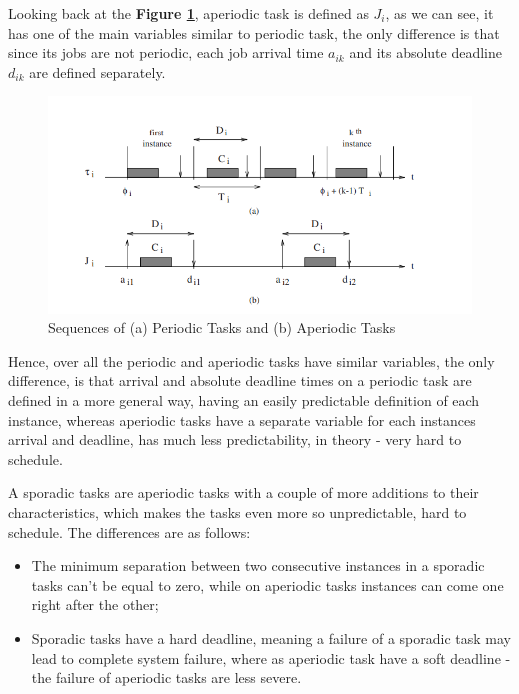 \documentclass[conference]{IEEEtran}
\begin{document}
Looking back at the \textbf{Figure \ref{tasks}}, aperiodic task is defined as $J_i$, as we can see, it has one of the main variables similar to periodic task, the only difference is that since its jobs are not periodic, each job arrival time $a_{ik}$ and its absolute deadline $d_{ik}$ are defined separately.

\begin{figure}[htbp]
\centerline{\includegraphics[scale=.48]{Tasks.png}}
\caption{Sequences of (a) Periodic Tasks and (b) Aperiodic Tasks \cite{b1}}
\label{tasks}
\end{figure}

Hence, over all the periodic and aperiodic tasks have similar variables, the only difference, is that arrival and absolute deadline times on a periodic task are defined in a more general way, having an easily predictable definition of each instance, whereas aperiodic tasks have a separate variable for each instances arrival and deadline, has much less predictability, in theory - very hard to schedule.

A sporadic tasks are aperiodic tasks with a couple of more additions to their characteristics, which makes the tasks even more so unpredictable, hard to schedule. The differences are as follows:

\begin{itemize}
    \item The minimum separation between two consecutive instances in a sporadic tasks can't be equal to zero, while on aperiodic tasks instances can come one right after the other;
    \item Sporadic tasks have a hard deadline, meaning a failure of a sporadic task may lead to complete system failure, where as aperiodic task have a soft deadline - the failure of aperiodic tasks are less severe.
\end{itemize}
\end{document}
